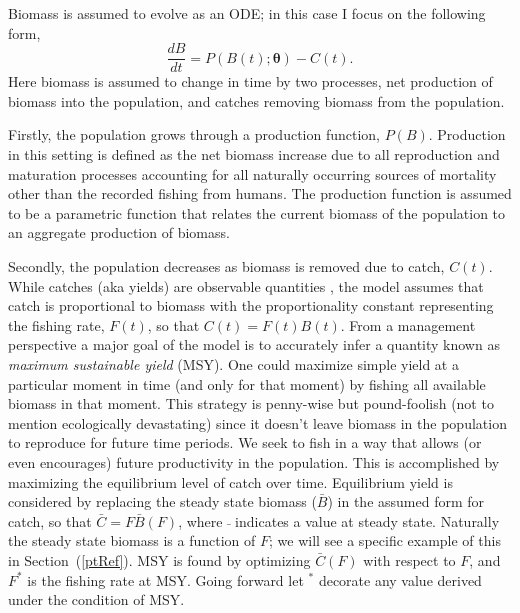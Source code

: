 \documentclass[12pt]{article}
\begin{document}
{%
Biomass is assumed to evolve as an ODE; in this case I focus on the following 
form,
%
\begin{equation}
\frac{dB}{dt} = P(B(t); \bm{\theta}) - C(t). \label{ode}
\end{equation}
Here biomass is assumed to change in time by two processes, net production of 
biomass into the population, and catches removing biomass from the population.

Firstly, the population grows through a production function, $P(B)$. Production 
in this setting is defined as the net biomass increase due to all reproduction 
and maturation processes accounting for all naturally occurring %
sources of mortality other than the recorded fishing from humans. The 
production function is assumed to be a parametric function that relates the 
current biomass of the population to an aggregate production of biomass. 

%
Secondly, the population decreases as biomass is removed due to catch, $C(t)$. 
While catches (aka yields) are observable quantities , %
the model assumes that catch is proportional to biomass with the 
proportionality constant representing the fishing rate, $F(t)$, so that $C(t)=F(t)B(t)$. 
From a management perspective a major goal of the model is to accurately infer 
a quantity known as \emph{maximum sustainable yield} (MSY). One could maximize 
simple yield at a particular moment in time (and only for that moment) by 
fishing all available biomass in that moment. This strategy is penny-wise but 
pound-foolish (not to mention ecologically devastating) since it doesn't leave 
biomass in the population to reproduce for future time periods. We seek to 
fish in a way that allows (or even encourages) future productivity in the 
population. This is accomplished by maximizing the equilibrium level of catch 
over time. Equilibrium yield is considered by replacing the steady state 
biomass ($\bar B$) in the assumed form for catch, so that $\bar C = F\bar B(F)$, 
where $\bar~$ indicates a value at steady state.  Naturally the steady state 
biomass is a function of $F$; we will see a specific example of this in 
\mbox{Section (\ref{ptRef}).} MSY is found by optimizing $\bar C(F)$ with respect to 
$F$, and $F^*$ is the fishing rate at MSY. Going forward let $^*$ decorate any 
value derived under the condition of MSY.  

}
\end{document}
